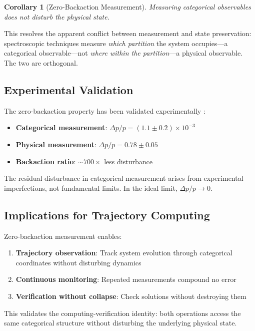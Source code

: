 \documentclass[twocolumn,10pt]{article}
\newtheorem{corollary}[theorem]{Corollary}
\theoremstyle{remark}
\begin{document}
\begin{corollary}[Zero-Backaction Measurement]
Measuring categorical observables does not disturb the physical state.
\end{corollary}

This resolves the apparent conflict between measurement and state preservation: spectroscopic techniques measure \textit{which partition} the system occupies---a categorical observable---not \textit{where within the partition}---a physical observable. The two are orthogonal.

\subsection{Experimental Validation}

The zero-backaction property has been validated experimentally \cite{sachikonye2024zerobackaction}:

\begin{itemize}
    \item \textbf{Categorical measurement}: $\Delta p/p = (1.1 \pm 0.2) \times 10^{-3}$
    \item \textbf{Physical measurement}: $\Delta p/p = 0.78 \pm 0.05$
    \item \textbf{Backaction ratio}: $\sim 700\times$ less disturbance
\end{itemize}

The residual disturbance in categorical measurement arises from experimental imperfections, not fundamental limits. In the ideal limit, $\Delta p/p \to 0$.

\subsection{Implications for Trajectory Computing}

Zero-backaction measurement enables:
\begin{enumerate}
    \item \textbf{Trajectory observation}: Track system evolution through categorical coordinates without disturbing dynamics
    \item \textbf{Continuous monitoring}: Repeated measurements compound no error
    \item \textbf{Verification without collapse}: Check solutions without destroying them
\end{enumerate}

This validates the computing-verification identity: both operations access the same categorical structure without disturbing the underlying physical state.
\end{document}
